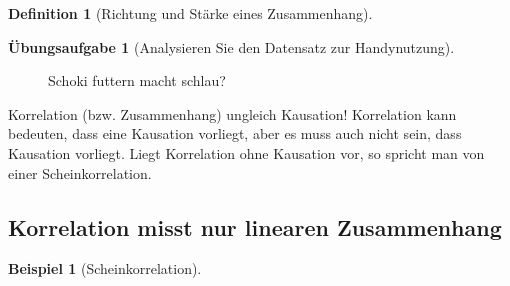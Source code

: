 \documentclass[
  a4paper,
  DIV=11]{scrreprt}
\theoremstyle{definition}
\newtheorem{exercise}{Übungsaufgabe}[chapter]
\theoremstyle{definition}
\newtheorem{example}{Beispiel}[chapter]
\theoremstyle{definition}
\newtheorem{definition}{Definition}[chapter]
\theoremstyle{remark}
\begin{document}
\begin{definition}[Richtung und Stärke eines
Zusammenhang]
\begin{exercise}[Analysieren Sie den Datensatz zur
Handynutzung]
\begin{figure}


\caption{\label{fig-schoki}Schoki futtern macht schlau?}

\end{figure}%

\begin{tcolorbox}[enhanced jigsaw, leftrule=.75mm, opacitybacktitle=0.6, colback=white, colframe=quarto-callout-caution-color-frame, coltitle=black, colbacktitle=quarto-callout-caution-color!10!white, opacityback=0, left=2mm, breakable, titlerule=0mm, toptitle=1mm, bottomtitle=1mm, rightrule=.15mm, title=\textcolor{quarto-callout-caution-color}{\faFire}\hspace{0.5em}{Vorsicht}, arc=.35mm, bottomrule=.15mm, toprule=.15mm]

Korrelation (bzw. Zusammenhang) ungleich Kausation! Korrelation kann
bedeuten, dass eine Kausation vorliegt, aber es muss auch nicht sein,
dass Kausation vorliegt. Liegt Korrelation ohne Kausation vor, so
spricht man von einer Scheinkorrelation.

\end{tcolorbox}

\subsection{Korrelation misst nur linearen
Zusammenhang}\label{korrelation-misst-nur-linearen-zusammenhang}

\begin{example}[Scheinkorrelation]\protect\hypertarget{exm-scheinkorr}{}\label{exm-scheinkorr}


\end{example}
\end{exercise}
\end{definition}
\end{document}
